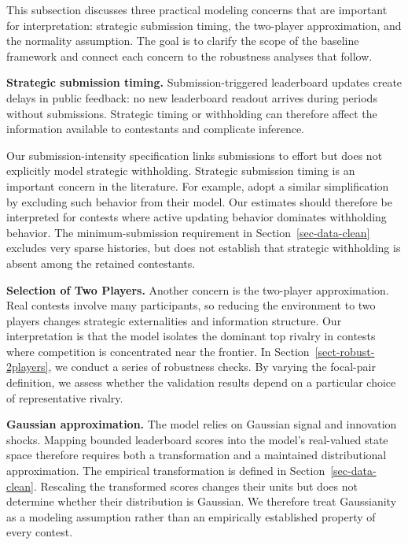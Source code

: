\documentclass[mnsc]{informs3}
\begin{document}
This subsection discusses three practical modeling concerns that are important for interpretation: strategic submission timing, the two-player approximation, and the normality assumption.
The goal is to clarify the scope of the baseline framework and connect each concern to the robustness analyses that follow.

\textbf{Strategic submission timing.}
Submission-triggered leaderboard updates create delays in public feedback: no new leaderboard readout arrives during periods without submissions. Strategic timing or withholding can therefore affect the information available to contestants and complicate inference.


Our submission-intensity specification links submissions to effort but does not explicitly model strategic withholding.
Strategic submission timing is an important concern in the literature.
For example, \citet{lemus2021dynamic} adopt a similar simplification by excluding such behavior from their model.
Our estimates should therefore be interpreted for contests where active updating behavior dominates withholding behavior.
{The minimum-submission requirement in Section~\ref{sec-data-clean} excludes very sparse histories, but does not establish that strategic withholding is absent among the retained contestants.}


\textbf{Selection of Two Players.}
Another concern is the two-player approximation.
Real contests involve many participants, so reducing the environment to two players changes strategic externalities and information structure.
Our interpretation is that the model isolates the dominant top rivalry in contests where competition is concentrated near the frontier.
In Section~\ref{sect-robust-2players}, we conduct a series of robustness checks.
By varying the focal-pair definition, we assess whether the validation results depend on a particular choice of representative rivalry.

\textbf{Gaussian approximation.}
The model relies on Gaussian signal and innovation shocks. Mapping bounded leaderboard scores into the model's real-valued state space therefore requires both a transformation and a maintained distributional approximation. The empirical transformation is defined in Section~\ref{sec-data-clean}. Rescaling the transformed scores changes their units but does not determine whether their distribution is Gaussian. We therefore treat Gaussianity as a modeling assumption rather than an empirically established property of every contest.
\end{document}
